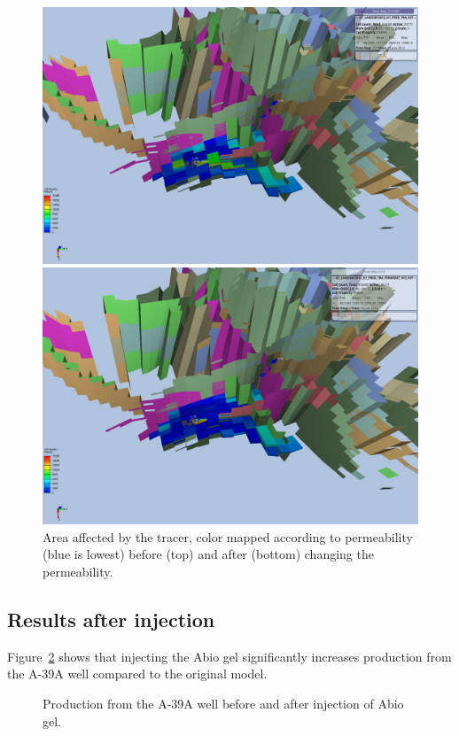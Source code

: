 \documentclass[final]{beamer}
\begin{document}
\begin{frame}[t]
\begin{multicols}{3}
\begin{figure}[H]
  \centering
  \includegraphics[clip=true, trim=6cm 7cm 11cm 13cm, width=0.8\columnwidth]{images/before_permedit.png}

  \includegraphics[clip=true, trim=6cm 7cm 11cm 13cm, width=0.8\columnwidth]{images/after_permedit.png}
  \caption{Area affected by the tracer, color mapped according to permeability (blue is lowest) before (top) and after (bottom) changing the permeability.}
  \label{fig:abio_area}
\end{figure}

\subsection{Results after injection} %
Figure~\ref{fig:abio_change} shows that injecting the Abio gel significantly increases production from the A-39A well compared to the original model.

\begin{figure}[H]
  \centering
  
  \caption{Production from the A-39A well before and after injection of Abio gel.}
  \label{fig:abio_change}
\end{figure}


\end{multicols}
\end{frame}
\end{document}
